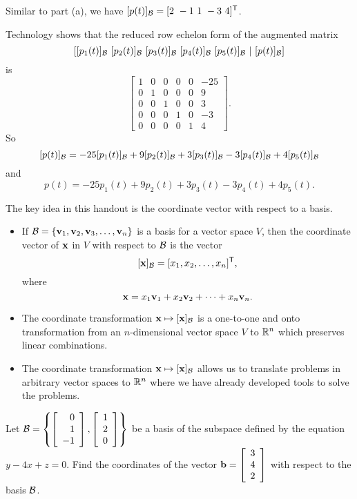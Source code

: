 \begin{example}
	\item Similar to part (a), we have $[p(t)]_{\mathcal{B}} = [2 \ -1 \ 1 \ -3 \ 4]^{\mathsf{T}}$. 
	
	\item Technology shows that the reduced row echelon form of the augmented matrix 
	\[[[p_1(t)]_{\CB} \ [p_2(t)]_{\CB} \ [p_3(t)]_{\CB} \ [p_4(t)]_{\CB} \ [p_5(t)]_{\CB} \ | \ [p(t)]_{\CB}]\] 
	is 
	\[\left[ \begin{array}{ccccc|r} 1&0&0&0&0&-25 \\ 0&1&0&0&0& 9 \\ 0&0&1&0&0&3 \\ 0&0&0&1&0&-3 \\ 0&0&0&0&1&4\end{array} \right].\]
	So 
	\[[p(t)]_{\mathcal{B}} = -25[p_1(t)]_{\mathcal{B}} +  9[p_2(t)]_{\mathcal{B}} + 3[p_3(t)]_{\mathcal{B}} - 3[p_4(t)]_{\mathcal{B}} +  4[p_5(t)]_{\mathcal{B}}\]
	and 
	\[p(t) = -25p_1(t) + 9p_2(t) + 3p_3(t) - 3p_4(t) + 4p_5(t).\]
	 
	\ea
	
\end{example}



The key idea in this handout is the coordinate vector with respect to a basis.

\begin{itemize}
\item If $\mathcal{B} = \{\mathbf{v}_1, \mathbf{v}_2, \mathbf{v}_3, \ldots, \mathbf{v}_n\}$ is a basis for a vector space $V$, then the coordinate vector of $\mathbf{x}$ in $V$ with respect to $\mathcal{B}$ is the vector
\[[\mathbf{x}]_{\mathcal{B}} = [x_1, x_2, \ldots, x_n]^{\mathsf{T}},\]
where
\[\mathbf{x} = x_1 \mathbf{v}_1 + x_2 \mathbf{v}_2 + \cdots + x_n \mathbf{v}_n.\]
\item The coordinate transformation $\mathbf{x} \mapsto [\mathbf{x}]_{\mathcal{B}}$ is a one-to-one and onto transformation from an $n$-dimensional vector space $V$ to $\mathbb{R}^n$ which preserves linear combinations.
\item The coordinate transformation $\mathbf{x} \mapsto [\mathbf{x}]_{\mathcal{B}}$ allows us to translate problems in arbitrary vector spaces to $\mathbb{R}^n$ where we have already developed tools to solve the problems.
\end{itemize}



\be
\item Let $\mathcal{B}=\left\{ \left[ \begin{array}{r} 0\\1\\-1 \end{array} \right], \left[ \begin{array}{c} 1\\2\\0 \end{array} \right] \right\}$ be a basis of the subspace defined by the equation $y-4x+z=0$. Find the coordinates of the vector $\mathbf{b}=\left[ \begin{array}{c} 3\\4\\2 \end{array} \right]$ with respect to the basis $\mathcal{B}$. 
 
